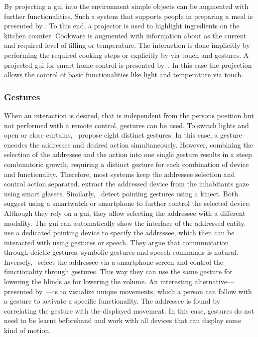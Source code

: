 By projecting a \gls{gui} into the environment simple objects can be augmented with further functionalities.
Such a system that supports people in preparing a meal is presented by .
To this end, a projector is used to highlight ingredients on the kitchen counter.
Cookware is augmented with information about as the current and required level of filling or temperature.
The interaction is done implicitly by performing the required cooking steps or explicitly by via touch and gestures.
A projected \gls{gui} for \gls{smart home} control is presented by~.
In this case the projection allows the control of basic functionalities like light and temperature via touch.

\subsubsection{Gestures}\label{sec.rw.hi.focused-dev-rw.gestures}

When an interaction is desired, that is independent from the persons position but not performed with a remote control, gestures can be used.
To switch lights and open or close curtains,~ propose eight distinct gestures.
In this case, a gesture encodes the \gls{addressee} and desired action simultaneously.
However, combining the selection of the \gls{addressee} and the action into one single gesture results in a steep combinatoric growth, requiring a distinct gesture for each combination of \gls{device} and functionality.
Therefore, most systems keep the \gls{addressee} selection and control action separated.
 extract the addressed \gls{device} from the inhabitants gaze using smart glasses.
Similarly,~ detect pointing gestures using a \gls{kinect}.
Both suggest using a smartwatch or smartphone to further control the selected \gls{device}.
Although they rely on a \gls{gui}, they allow selecting the \gls{addressee} with a different modality.
The \gls{gui} can automatically show the interface of the addressed entity.
 use a dedicated pointing \gls{device} to specify the \gls{addressee}, which then can be interacted with using gestures or speech.
They argue that communication through deictic gestures, symbolic gestures and speech commands is natural.
Inversely,~ select the \gls{addressee} via a smartphone screen and control the functionality through gestures.
This way they can use the same gesture for lowering the blinds as for lowering the volume.
An interesting alternative---presented by~---is to visualize unique movements, which a person can follow with a gesture to activate a specific functionality.
The \gls{addressee} is found by correlating the gesture with the displayed movement.
In this case, gestures do not need to be learnt beforehand and work with all \glspl{device} that can display some kind of motion.

